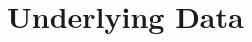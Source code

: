 \documentclass[10pt,a4paper,twocolumn]{scrartcl}
\begin{document}
\section{Underlying Data}
%
%
\end{document}
